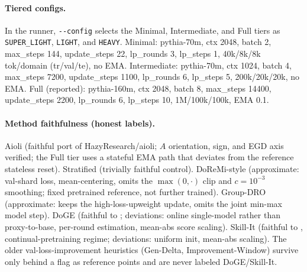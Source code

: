 \documentclass{article}
\begin{document}
\paragraph{Tiered configs.} In the runner, \texttt{-{}-config} selects the Minimal, Intermediate, and Full tiers as \texttt{SUPER\_LIGHT}, \texttt{LIGHT}, and \texttt{HEAVY}. Minimal: pythia-70m, ctx 2048, batch 2, max\_steps 144, update\_steps 22, lp\_rounds 3, lp\_steps 1, 40k/8k/8k tok/domain (tr/val/te), no EMA. Intermediate: pythia-70m, ctx 1024, batch 4, max\_steps 7200, update\_steps 1100, lp\_rounds 6, lp\_steps 5, 200k/20k/20k, no EMA. Full (reported): pythia-160m, ctx 2048, batch 8, max\_steps 14400, update\_steps 2200, lp\_rounds 6, lp\_steps 10, 1M/100k/100k, EMA 0.1.

\paragraph{Method faithfulness (honest labels).} Aioli (faithful port of HazyResearch/aioli; $A$ orientation, sign, and EGD axis verified; the Full tier uses a stateful EMA path that deviates from the reference stateless reset). Stratified (trivially faithful control). DoReMi-style (approximate: val-shard loss, mean-centering, omits the $\max(0,\cdot)$ clip and $c=10^{-3}$ smoothing; fixed pretrained reference, not further trained). Group-DRO (approximate: keeps the high-loss-upweight update, omits the joint min-max model step). DoGE (faithful to \citet{doge2024}; deviations: online single-model rather than proxy-to-base, per-round estimation, mean-abs score scaling). Skill-It (faithful to \citet{skillit2023}, continual-pretraining regime; deviations: uniform init, mean-abs scaling). The older val-loss-improvement heuristics (Gen-Delta, Improvement-Window) survive only behind a flag as reference points and are never labeled DoGE/Skill-It.
\end{document}
